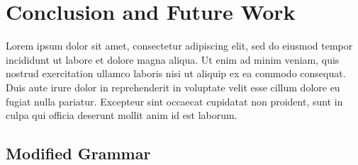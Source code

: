 \documentclass[letterpaper,twocolumn,10pt]{article}
\begin{document}
\section{Conclusion and Future Work} \label{conclusion}
Lorem ipsum dolor sit amet, consectetur adipiscing elit, sed do eiusmod tempor incididunt ut labore et dolore magna aliqua. Ut enim ad minim veniam, quis nostrud exercitation ullamco laboris nisi ut aliquip ex ea commodo consequat. Duis aute irure dolor in reprehenderit in voluptate velit esse cillum dolore eu fugiat nulla pariatur. Excepteur sint occaecat cupidatat non proident, sunt in culpa qui officia deserunt mollit anim id est laborum.

{\footnotesize 
  }

\theendnotes


\begin{appendices}

\section{Modified Grammar} \label{App:grammar}

\end{appendices}
\end{document}
